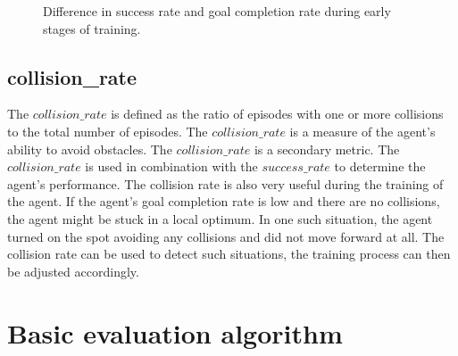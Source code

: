 \begin{figure}
    \centering
    \caption{Difference in success rate and goal completion rate during early stages of training.}
    \label{fig:success_rate_vs_goal_completion_rate}
\end{figure}

\subsection{collision\_rate}

The $collision\_rate$ is defined as the ratio of episodes with one or more collisions to the total number of episodes. The $collision\_rate$ is a measure of the agent's ability to avoid obstacles. The $collision\_rate$ is a secondary metric. The $collision\_rate$ is used in combination with the $success\_rate$ to determine the agent's performance.
The collision rate is also very useful during the training of the agent. If the agent's goal completion rate is low and there are no collisions, the agent might be stuck in a local optimum. In one such situation, the agent turned on the spot avoiding any collisions and did not move forward at all.
The collision rate can be used to detect such situations, the training process can then be adjusted accordingly.


\section{Basic evaluation algorithm}
\label{sec:basic_evaluation_algorithm}

